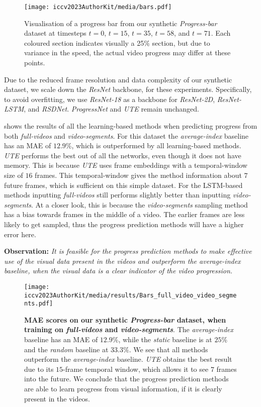 \begin{figure}[t]
\begin{center}
   \texttt{[image: iccv2023AuthorKit/media/bars.pdf]}
\end{center}
   \caption{Visualisation of a progress bar from our synthetic \textsl{Progress-bar} dataset at timesteps $t{=}0$, $t{=}15$, $t{=}35$, $t{=}58$, and $t{=}71$. 
   Each coloured section indicates visually a 25\% section, but due to variance in the speed, the actual video progress may differ at these points.
   }
\label{fig:progressbars}
\end{figure}
Due to the reduced frame resolution and data complexity of our synthetic dataset, we scale down the \textsl{ResNet} backbone, for these experiments. 
Specifically, to avoid overfitting, we use \textsl{ResNet-18} as a backbone for \textsl{ResNet-2D}, \textsl{ResNet-LSTM}, and \textsl{RSDNet}. 
\textsl{ProgressNet} and \textsl{UTE} remain unchanged.


 shows the results of all the learning-based methods when predicting progress from both \textsl{full-videos} and \textsl{video-segments}. 
For this dataset the \textsl{average-index} baseline has an MAE of $12.9$\%, which is outperformed by all learning-based methods. 
\textsl{UTE} performs the best out of all the networks, even though it does not have memory. 
This is because \textsl{UTE} uses frame embeddings with a temporal-window size of $16$ frames. 
This temporal-window gives the method information about $7$ future frames, which is sufficient on this simple dataset. 
For the LSTM-based methods inputting \textsl{full-videos} still performs slightly better than inputting \textsl{video-segments}. 
At a closer look, this is because the \textsl{video-segments} sampling method has a bias towards frames in the middle of a video. 
The earlier frames are less likely to get sampled, thus the progress prediction methods will have a higher error here.

\smallskip\noindent\textbf{Observation:} \emph{It is feasible for the progress prediction methods to make effective use of the visual data present in the videos and outperform the \textsl{average-index} baseline, when the visual data is a clear indicator of the video progression.
}
\begin{figure}
\begin{center}
   \texttt{[image: iccv2023AuthorKit/media/results/Bars\_full\_video\_video\_segments.pdf]}
\end{center}
   \caption{\textbf{MAE scores on our synthetic \textsl{Progress-bar} dataset, when training on \textsl{full-videos} and \textsl{video-segments}}. 
   The \textsl{average-index} baseline has an MAE of $12.9\%$, while the \textsl{static} baseline is at $25\%$ and the \textsl{random} baseline at $33.3\%$. 
   We see that all methods outperform the \textsl{average-index} baseline. 
   \textsl{UTE} obtains the best result due to its $15$-frame temporal window, which allows it to see $7$ frames into the future. 
   We conclude that the progress prediction methods are able to learn progress from visual information, if it is clearly present in the videos.}
\label{fig:result_bars}
\end{figure}